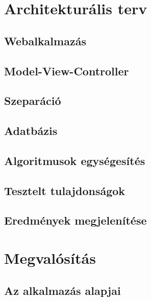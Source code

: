 \documentclass[12pt]{report} %
\begin{document}
\chapter{Architekturális terv} %

\section{Webalkalmazás} %

\section{Model-View-Controller} %

\section{Szeparáció} %

\section{Adatbázis} %

\section{Algoritmusok egységesítés} %

\section{Tesztelt tulajdonságok} %

\section{Eredmények megjelenítése} %

\chapter{Megvalósítás} %

\section{Az alkalmazás alapjai} %
\end{document}
